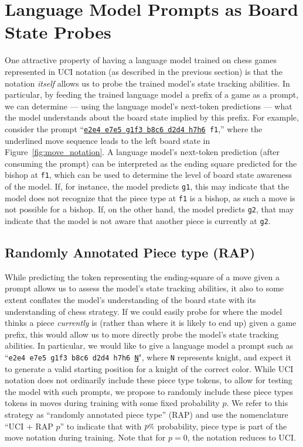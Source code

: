 \documentclass[12pt]{thesis-umich}[thesis]
\newcommand*\pct{\scalebox{.8}{\%}}
\newcommand{\pos}[1]{\texttt{#1}}
\begin{document}
  \section{Language Model Prompts as Board State Probes}
\label{sec:probing}
One attractive property of having a language model trained on chess games represented in UCI notation (as described in the previous section) is that the notation \textit{itself} allows us to probe the trained model's state tracking abilities. In particular, by feeding the trained language model a prefix of a game as a prompt, we can determine --- using the language model's next-token predictions --- what the model understands about the board state implied by this prefix.
For example, consider the prompt ``\pos{\underline{e2e4 e7e5 g1f3 b8c6 d2d4 h7h6} f1},''  where the underlined move sequence leads to the left board state in Figure~\ref{fig:move_notation}. A language model's next-token prediction (after consuming the prompt) can be interpreted as the ending square predicted for the bishop at \pos{f1}, which can be used to determine the level of board state awareness of the model. If, for instance, the model predicts \pos{g1}, this may indicate that the model does not recognize that the piece type at \pos{f1} is a bishop, as such a move is not possible for a bishop.
If, on the other hand, the model predicts \pos{g2}, that may indicate that the model is not aware that another piece is currently  at \pos{g2}.

\subsection{Randomly Annotated Piece type (RAP)}
\label{sec:rap_board}
While predicting the token representing the ending-square of a move given a prompt allows us to assess the model's state tracking abilities, it also to some extent conflates the model's understanding of the board state with its understanding of chess strategy. If we could easily probe for where the model thinks a piece \textit{currently} is (rather than where it is likely to end up) given a game prefix, this would allow us to more directly probe the model's state tracking abilities. 
In particular, we would like to give a language model a prompt such as ``\pos{e2e4 e7e5 g1f3 b8c6 d2d4 h7h6 \underline{N}}", where \pos{N} represents knight, and expect it to generate a valid starting position for a knight of the correct color. 
While UCI notation does not ordinarily include these piece type tokens, to allow for testing the model with such prompts, 
we propose to randomly include these piece types tokens in moves during training with some fixed probability $p$.
We refer to this strategy as ``randomly annotated piece type'' (RAP) and 
use the nomenclature ``UCI + RAP $p$'' to indicate that with $p\pct$ probability, piece type is part of the move notation during training.
Note that for $p = 0$, the notation reduces to UCI. 
\end{document}

